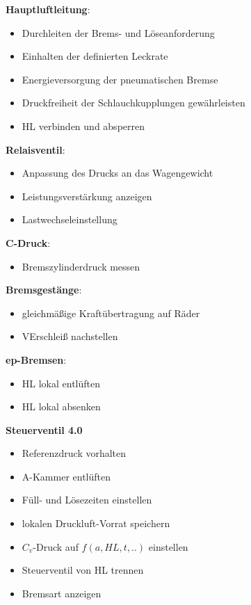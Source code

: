\begin{fkt} \textbf{Hauptluftleitung}:
\begin{itemize}
    \item Durchleiten der Brems- und Löseanforderung
    \item Einhalten der definierten Leckrate
    \item Energieversorgung der pneumatischen Bremse
    \item Druckfreiheit der Schlauchkupplungen gewährleisten
    \item HL verbinden und absperren
\end{itemize}
\end{fkt}

\begin{fkt} \textbf{Relaisventil}:
\begin{itemize}
    \item Anpassung des Drucks an das Wagengewicht
    \item Leistungsverstärkung anzeigen
    \item Lastwechseleinstellung
\end{itemize}
\end{fkt}

\begin{fkt} \textbf{C-Druck}:
\begin{itemize}
    \item Bremszylinderdruck messen
\end{itemize}
\end{fkt}

\begin{fkt} \textbf{Bremsgestänge}:
\begin{itemize}
    \item gleichmäßige Kraftübertragung auf Räder
    \item VErschleiß nachstellen
\end{itemize}
\end{fkt}

\begin{fkt} \textbf{ep-Bremsen}:
\begin{itemize}
    \item HL lokal entlüften
    \item HL lokal absenken
\end{itemize}
\end{fkt}

\begin{fkt} \textbf{Steuerventil 4.0}
\begin{itemize}
    \item Referenzdruck vorhalten
    \item A-Kammer entlüften
    \item Füll- und Lösezeiten einstellen
    \item lokalen Druckluft-Vorrat speichern
    \item $C_v$-Druck auf $f(a, HL, t, ..)$ einstellen
    \item Steuerventil von HL trennen
    \item Bremsart anzeigen
\end{itemize}
\end{fkt}